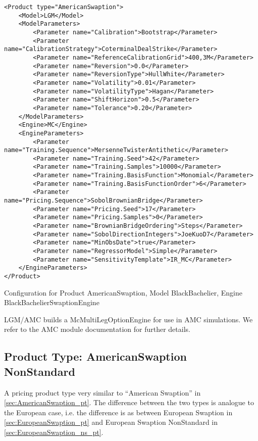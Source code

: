 \begin{longlisting}
\begin{verbatim}
<Product type="AmericanSwaption">
    <Model>LGM</Model>
    <ModelParameters>
        <Parameter name="Calibration">Bootstrap</Parameter>
        <Parameter name="CalibrationStrategy">CoterminalDealStrike</Parameter>
        <Parameter name="ReferenceCalibrationGrid">400,3M</Parameter>
        <Parameter name="Reversion">0.0</Parameter>
        <Parameter name="ReversionType">HullWhite</Parameter>
        <Parameter name="Volatility">0.01</Parameter>
        <Parameter name="VolatilityType">Hagan</Parameter>
        <Parameter name="ShiftHorizon">0.5</Parameter>
        <Parameter name="Tolerance">0.20</Parameter>
    </ModelParameters>
    <Engine>MC</Engine>
    <EngineParameters>
        <Parameter name="Training.Sequence">MersenneTwisterAntithetic</Parameter>
        <Parameter name="Training.Seed">42</Parameter>
        <Parameter name="Training.Samples">10000</Parameter>
        <Parameter name="Training.BasisFunction">Monomial</Parameter>
        <Parameter name="Training.BasisFunctionOrder">6</Parameter>
        <Parameter name="Pricing.Sequence">SobolBrownianBridge</Parameter>
        <Parameter name="Pricing.Seed">17</Parameter>
        <Parameter name="Pricing.Samples">0</Parameter>
        <Parameter name="BrownianBridgeOrdering">Steps</Parameter>
        <Parameter name="SobolDirectionIntegers">JoeKuoD7</Parameter>
        <Parameter name="MinObsDate">true</Parameter>
        <Parameter name="RegressorModel">Simple</Parameter>
        <Parameter name="SensitivityTemplate">IR_MC</Parameter>
    </EngineParameters>
</Product>
\end{verbatim}
\caption{Configuration for Product AmericanSwaption, Model BlackBachelier, Engine BlackBachelierSwaptionEngine}
\label{lst:peconfig_AmericanSwaption_LGM_MC}
\end{longlisting}

LGM/AMC builds a McMultiLegOptionEngine for use in AMC simulations. We refer to the AMC module documentation for further
details.

\subsection{Product Type: AmericanSwaption NonStandard}

A pricing product type very similar to ``American Swaption'' in \ref{sec:AmericanSwaption_pt}. 
The difference between the two types is analogue to the European case, i.e. the difference is 
as between European Swaption in \ref{sec:EuropeanSwaption_pt} and European Swaption NonStandard in \ref{sec:EuropeanSwaption_ns_pt}.


